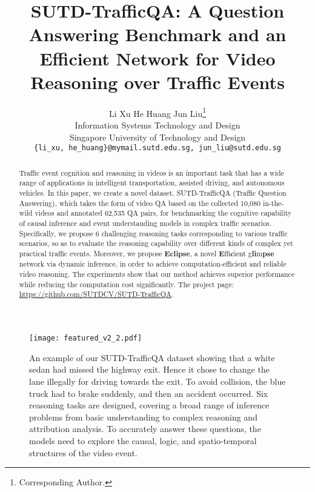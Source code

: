 \documentclass[final]{cvpr}
\begin{document}
\title{SUTD-TrafficQA: A Question Answering Benchmark and an Efficient Network for Video Reasoning over Traffic Events}
\author{Li Xu \qquad He Huang \qquad Jun Liu\thanks{Corresponding Author.} \\
Information Systems Technology and Design \\
Singapore University of Technology and Design \\
{\tt\small \{li\_xu, he\_huang\}@mymail.sutd.edu.sg, jun\_liu@sutd.edu.sg}}


\maketitle
\pagestyle{empty}
\thispagestyle{empty}

\begin{figure*}[htbp]
\begin{center}
    \texttt{[image: featured\_v2\_2.pdf]}
\end{center}
\vspace{-0.6cm}
    \caption{An example of our SUTD-TrafficQA dataset showing that a white sedan had missed the highway exit. Hence it chose to change the lane illegally for driving towards the exit. To avoid collision, the blue truck had to brake suddenly, and then an accident occurred.
Six reasoning tasks are designed, covering a broad range of inference problems from basic understanding to complex reasoning and attribution analysis.
    To accurately answer these questions, the models need to explore the causal, logic, and spatio-temporal structures of the video event.
    }
\label{fig:example}
\vspace{-0.2cm}
\end{figure*}




\begin{abstract}
Traffic event cognition and reasoning in videos is an important task that has a wide range of applications in intelligent transportation, assisted driving, and autonomous vehicles.
In this paper, we create a novel dataset, SUTD-TrafficQA (Traffic Question Answering), which takes the form of video QA based on the collected 10,080 in-the-wild videos and annotated 62,535 QA pairs, for benchmarking the cognitive capability of 
causal inference and event understanding models in complex traffic scenarios.
Specifically, we propose 6 challenging reasoning tasks corresponding to various traffic scenarios, so as to evaluate the reasoning capability over different kinds of complex yet practical traffic events. 
Moreover, we propose \textbf{Eclipse}, a novel \textbf{E}ffi\textbf{c}ient g\textbf{li}m\textbf{pse} network via dynamic inference, in order to achieve computation-efficient and reliable video reasoning. The experiments show that our method achieves superior performance while reducing the computation cost significantly. The project page: \url{https://github.com/SUTDCV/SUTD-TrafficQA}.


\end{abstract}
\end{document}
